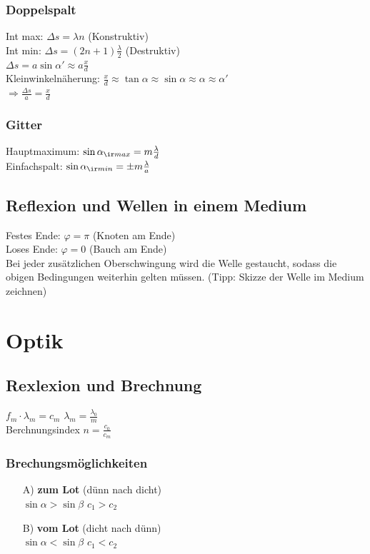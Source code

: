 \documentclass[german]{latex4ei/latex4ei_sheet}
\begin{document}
\subsubsection{Doppelspalt}
Int max: $\Delta s = \lambda n$ (Konstruktiv)\\
Int min: $\Delta s = (2n+1)\frac{\lambda}{2}$ (Destruktiv)\\
$\Delta s = a \sin \alpha' \approx a \frac{x}{d}$\\
Kleinwinkelnäherung: $\frac{x}{d}\approx \tan \alpha \approx \sin \alpha \approx \alpha \approx \alpha'$\\
$\Rightarrow \frac{\Delta s}{a} = \frac{x}{d}$
\subsubsection{Gitter}
Hauptmaximum: $\sin \alpha_{\ir max} = m\frac{\lambda}{d}$\\
Einfachspalt: $\sin \alpha_{\ir min} = \pm m \frac{\lambda}{a}$
\subsection{Reflexion und Wellen in einem Medium}
Festes Ende: $\varphi = \pi$ (Knoten am Ende)\\
Loses Ende: $\varphi = 0$ (Bauch am Ende)\\
Bei jeder zusätzlichen Oberschwingung wird die Welle gestaucht, sodass die obigen Bedingungen weiterhin gelten müssen. (Tipp: Skizze der Welle im Medium zeichnen)


\section{Optik}

\subsection{Rexlexion und Brechnung}
$f_m \cdot \lambda_m = c_m$ \qquad
$\lambda_m = \frac{\lambda_0}{m}$\\
Berchnungsindex $n=\frac{c_0}{c_m}$
\subsubsection{Brechungsmöglichkeiten}
\begin{enumerate}
\item[A)] \textbf{zum Lot} (dünn nach dicht)\\
$\sin \alpha > \sin \beta$ \qquad $c_1 > c_2$
\item[B)] \textbf{vom Lot} (dicht nach dünn)\\
$\sin \alpha < \sin \beta$ \qquad $c_1 < c_2$
\end{enumerate}
\end{document}
